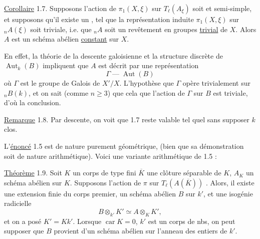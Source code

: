 \uline{Corollaire} 1.7. Supposons    l'action de $\pi_1(X,\xi)$ sur $T_\ell(A_\xi)$ soit  et semi-simple, et supposons qu'il existe un ,  tel que la représentation  induite  $\pi_1(X,\xi)$ sur ${}_n A(\xi)$ soit triviale, i.e. que ${}_n A$ soit un revêtement en groupes \uline{trivial} de $X$. Alors  $A$ est un schéma abélien \uline{constant} sur $X$.

En effet,  la théorie de la descente galoisienne et la structure discrète de $\operatorname{Aut}_k(B)$ impliquent que
$A$ est décrit par une représentation
\[
\Gamma\mathrel{\text{---}}\operatorname{Aut}(B)
\]
où $\Gamma$ est le groupe de Galois de $X'/X$. L'hypothèse  que $\Gamma$ opère trivialement sur ${}_n B(k)$, et on sait  (comme $n\geq3$) que cela  que l'action de $\Gamma$ sur $B$ est triviale, d'où la conclusion.

\uline{Remarque} 1.8.  Par descente, on voit que 1.7 reste valable tel quel sans supposer $k$   clos.

L'\uline{énoncé} 1.5 est de nature purement géométrique, (bien que sa démonstration soit de nature arithmétique). Voici une variante arithmétique de 1.5 :

\uline{Théorème} 1.9. Soit $K$ un corps de type fini  $\overline K$ une clôture séparable de $K$,  $A_K$ un schéma abélien sur $K$. Supposons l'action de $\pi$ sur $T_\ell(A(\overline K))$  . Alors, il existe une extension finie   du corps premier,   un schéma abélien $B$ sur $k'$, et une isogénie radicielle 
\[
B\otimes_{k'}K'\simeq A\otimes_K K',
\]
et on a posé \deleted{\unsure{$\ell$}} $K'=Kk'$. Lorsque $\operatorname{car}K=0$,   $k'$ est  un corps de nbs, on peut supposer que $B$  provient d'un schéma abélien sur  l'anneau des entiers de $k'$.

